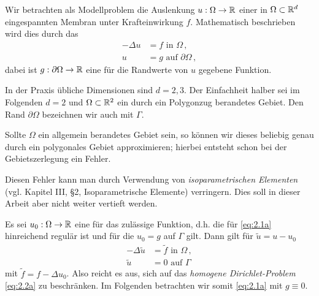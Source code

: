 Wir betrachten als Modellproblem die Auslenkung $u: \Omega \rightarrow \mathbb{R}$ einer in $\Omega \subset \mathbb{R}^d$ eingespannten Membran unter Krafteinwirkung $f$. Mathematisch beschrieben wird dies durch das  \textit{}
\begin{subequations}\label{eq:2.1a}
\begin{align}\label{eq:2.1aa}
	-\Delta u &= f \text{ in } \Omega \, ,\\
	\label{eq:2.1ab}
	u & = g \text{ auf } \partial \Omega \, ,
\end{align}
\end{subequations}
dabei ist $g: \partial \Omega \rightarrow \mathbb{R}$ eine für die Randwerte von $u$ gegebene Funktion.


\begin{notation} 
In der Praxis übliche Dimensionen sind $d = 2,3$. Der Einfachheit halber sei im Folgenden $d = 2$ und $\Omega \subset \mathbb{R}^2$ ein durch ein Polygonzug berandetes Gebiet. Den Rand $\partial \Omega$ bezeichnen wir auch mit $\Gamma$.
\end{notation}


\begin{bem*}
Sollte $\Omega$ ein allgemein berandetes Gebiet sein, so können wir dieses beliebig genau durch ein polygonales Gebiet approximieren; hierbei entsteht schon bei der Gebietszerlegung ein Fehler.

Diesen Fehler kann man durch Verwendung von \textit{isoparametrischen Elementen} (vgl. \cite{BraeFEM} Kapitel III, \S2, Isoparametrische Elemente) verringern. Dies soll in dieser Arbeit aber nicht weiter vertieft werden.
\end{bem*}


Es sei $u_0: \Omega \rightarrow \mathbb{R}$ eine für das  zulässige Funktion, d.h. die für   \eqref{eq:2.1a} hinreichend regulär ist und für die $u_0 = g$ auf $\Gamma$ gilt. Dann gilt für 
$\tilde u = u-u_0$
\begin{subequations}\label{eq:2.2a}
\begin{align}\label{eq:2.2aa}
	-\Delta \tilde u &= \tilde f \text{ in } \Omega \, ,\\
	\label{eq:2.2ab}
	\tilde u & = 0 \text{ auf } \Gamma 
\end{align}
\end{subequations}
mit $\tilde f = f-\Delta u_0$. Also reicht es aus, sich auf das \textit{homogene Dirichlet-Problem} \eqref{eq:2.2a} zu beschränken. Im Folgenden betrachten wir somit \eqref{eq:2.1a} mit $g \equiv 0$.

